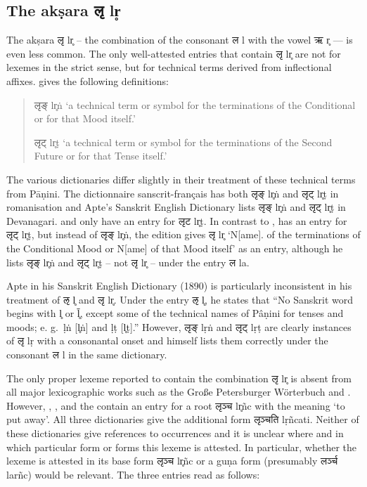 \subsection{The akṣara {\devhmfont लृ} lr̥}

The akṣara {\devfont लृ} lr̥ – the combination of the consonant {\devfont ल} l with the vowel {\devfont ऋ} r̥ — is even less common. The only well-attested entries that contain {\devfont लृ} lr̥ are not for lexemes in the strict sense, but for technical terms derived from inflectional affixes. \citet{mw72} gives the following definitions:

\begin{quote}
{\devbfont लृङ्} lr̥ṅ ‘a technical term or symbol for the terminations of the Conditional or for that Mood itself.’ 

{\devbfont लृट्} lr̥ṭ ‘a technical term or symbol for the terminations of the Second Future or for that Tense itself.’ 
\end{quote}


The various dictionaries differ slightly in their treatment of these technical terms from Pāṇini. The dictionnaire sanscrit-français \citep{stc} has both {\devfont लृङ्} lr̥ṅ and {\devfont लृट्} lr̥ṭ  in romanisation and Apte’s Sanskrit English Dictionary \citep{ap90} lists {\devfont लृङ्} lr̥ṅ and {\devfont लृट्} lr̥ṭ in Devanagari. \citet{ccs,cae}  and \citet{md} only have an entry for {\devfont लृट} lr̥ṭ. In contrast to \citet{mw72}, \citet{mw} has an entry for {\devfont लृट्} lr̥ṭ, but instead of {\devfont लृङ्} lr̥ṅ, the \citet{mw} edition gives {\devfont लृ} lr̥ ‘N[ame]. of the terminations of the Conditional Mood or N[ame] of that Mood itself’ as an entry, although he lists {\devfont लृङ्} lr̥ṅ and {\devfont लृट्} lr̥ṭ – not {\devfont लृ} lr̥ – under the entry {\devfont ल} la. 

Apte in his Sanskrit English Dictionary (1890) is particularly inconsistent in his treatment of {\devfont ऌ} l̥ and {\devfont लृ} lr̥. Under the entry {\devfont ऌ} l̥, he states that “No Sanskrit word begins with l̥ or l̥̄, except some of the technical names of Pâṇini for tenses and moods; e. g.~ḷṅ [l̥ṅ] and ḷṭ [l̥ṭ].” However, {\devfont लृङ्} lṛṅ  and {\devfont लृट्} lṛṭ are clearly instances of {\devfont लृ} lṛ with a consonantal onset and \citet{ap90} himself lists them correctly under the consonant {\devfont ल} l in the same dictionary.

The only proper lexeme reported to contain the combination {\devfont लृ} lr̥ is absent from all major lexicographic works such as the Große Petersburger Wörterbuch \citep{pwg} and \citet{mw72,mw}.  However, \citet{wil}, \citet{yat}, and the \citet{shs} contain an entry for a root {\devfont लृञ्च} lr̥ñc with the meaning ‘to put away’. All three dictionaries give the additional form {\devfont लृञ्चति}  lṛñcati. Neither of these dictionaries give references to occurrences and it is unclear where and in which particular form or forms this lexeme is attested. In particular, whether the lexeme is attested in its base form {\devfont लृञ्च} lr̥ñc or a guṇa form (presumably {\devfont लर्ञ्च} larñc) would be relevant. The three entries read as follows:

